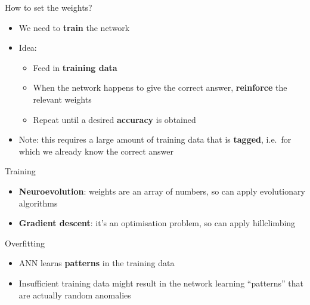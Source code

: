 \begin{frame}{How to set the weights?}
	\begin{itemize}
		\pause\item We need to \textbf{train} the network
		\pause\item Idea:
			\begin{itemize}
				\pause\item Feed in \textbf{training data}
				\pause\item When the network happens to give the correct answer, \textbf{reinforce}
					the relevant weights
				\pause\item Repeat until a desired \textbf{accuracy} is obtained
			\end{itemize}
		\pause\item Note: this requires a large amount of training data that is \textbf{tagged},
			i.e.\ for which we already know the correct answer
	\end{itemize}
\end{frame}

\begin{frame}{Training}
	\begin{itemize}
		\pause\item \textbf{Neuroevolution}: weights are an array of numbers, so can apply evolutionary algorithms
		\pause\item \textbf{Gradient descent}: it's an optimisation problem, so can apply hillclimbing
	\end{itemize}
\end{frame}

\begin{frame}{Overfitting}
	\begin{itemize}
		\pause\item ANN learns \textbf{patterns} in the training data
		\pause\item Insufficient training data might result in the network learning ``patterns''
			that are actually random anomalies
	\end{itemize}
\end{frame}

